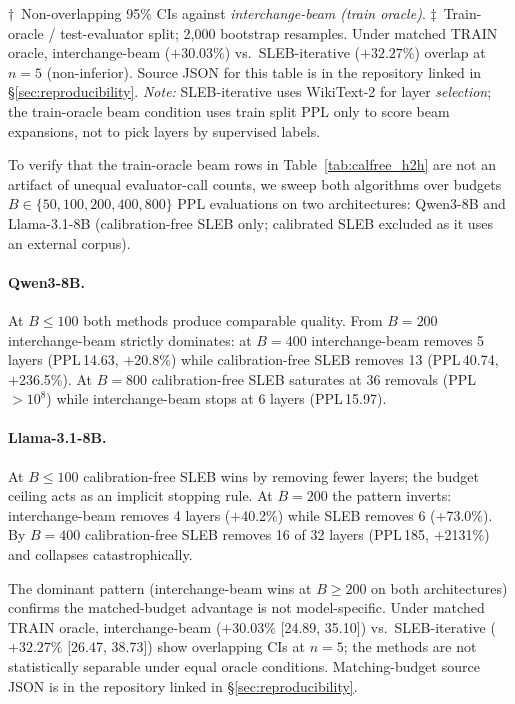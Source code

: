 \documentclass{article}
\begin{document}
\vspace{-4pt}
{\small $\dagger$~Non-overlapping 95\% CIs against \emph{interchange-beam (train oracle)}. $\ddagger$~Train-oracle / test-evaluator split; 2{,}000 bootstrap resamples. Under matched TRAIN oracle, interchange-beam ($+30.03\%$) vs.\ SLEB-iterative ($+32.27\%$) overlap at $n{=}5$ (non-inferior). Source JSON for this table is in the repository linked in \S\ref{sec:reproducibility}. \emph{Note:} SLEB-iterative uses WikiText-2 for layer \emph{selection}; the train-oracle beam condition uses train split PPL only to score beam expansions, not to pick layers by supervised labels.}

To verify that the train-oracle beam rows in Table~\ref{tab:calfree_h2h} are not an artifact of unequal evaluator-call counts, we sweep both algorithms over budgets $B\in\{50,100,200,400,800\}$ PPL evaluations on two architectures: Qwen3-8B and Llama-3.1-8B (calibration-free SLEB only; calibrated SLEB excluded as it uses an external corpus).

\paragraph{Qwen3-8B.} At $B{\leq}100$ both methods produce comparable quality. From $B{=}200$ interchange-beam strictly dominates: at $B{=}400$ interchange-beam removes 5 layers (PPL\,14.63, $+$20.8\%) while calibration-free SLEB removes 13 (PPL\,40.74, $+$236.5\%). At $B{=}800$ calibration-free SLEB saturates at 36 removals (PPL\,$>\!10^{8}$) while interchange-beam stops at 6 layers (PPL\,15.97).

\paragraph{Llama-3.1-8B.} At $B{\leq}100$ calibration-free SLEB wins by removing fewer layers; the budget ceiling acts as an implicit stopping rule. At $B{=}200$ the pattern inverts: interchange-beam removes 4 layers ($+$40.2\%) while SLEB removes 6 ($+$73.0\%). By $B{=}400$ calibration-free SLEB removes 16 of 32 layers (PPL\,185, $+$2131\%) and collapses catastrophically.

The dominant pattern (interchange-beam wins at $B{\geq}200$ on both architectures) confirms the matched-budget advantage is not model-specific. Under matched TRAIN oracle, interchange-beam ($+30.03\%$ [24.89, 35.10]) vs.\ SLEB-iterative ($+32.27\%$ [26.47, 38.73]) show overlapping CIs at $n{=}5$; the methods are not statistically separable under equal oracle conditions. Matching-budget source JSON is in the repository linked in \S\ref{sec:reproducibility}.
\end{document}
